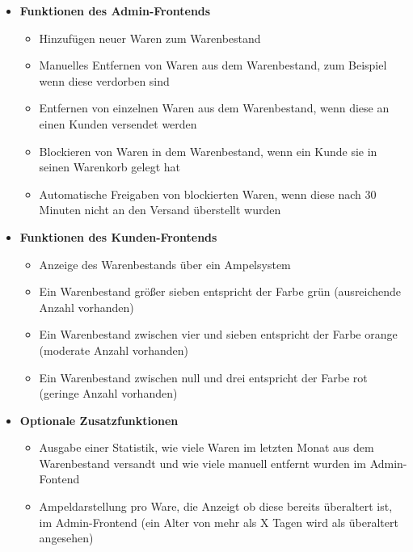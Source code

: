 \begin{itemize}
	\item \textbf{Funktionen des Admin-Frontends}
	\begin{itemize}
		\item Hinzufügen neuer Waren zum Warenbestand
		\item Manuelles Entfernen von Waren aus dem Warenbestand, zum Beispiel wenn diese verdorben sind
		\item Entfernen von einzelnen Waren aus dem Warenbestand, wenn diese an einen Kunden versendet werden
		\item Blockieren von Waren in dem Warenbestand, wenn ein Kunde sie in seinen Warenkorb gelegt hat
		\item Automatische Freigaben von blockierten Waren, wenn diese nach 30 Minuten nicht an den Versand überstellt wurden
	\end{itemize}
	\item \textbf{Funktionen des Kunden-Frontends}
	\begin{itemize}
		\item Anzeige des Warenbestands über ein Ampelsystem 
		\item Ein Warenbestand größer sieben entspricht der Farbe grün (ausreichende Anzahl vorhanden)
		\item Ein Warenbestand zwischen vier und sieben entspricht der Farbe orange (moderate Anzahl vorhanden)		
		\item Ein Warenbestand zwischen null und drei entspricht der Farbe rot (geringe Anzahl vorhanden)
	\end{itemize}
	\item \textbf{Optionale Zusatzfunktionen}
	\begin{itemize}
		\item Ausgabe einer Statistik, wie viele Waren im letzten Monat aus dem Warenbestand versandt und wie viele manuell entfernt wurden im Admin-Fontend
		\item Ampeldarstellung pro Ware, die Anzeigt ob diese bereits überaltert ist, im Admin-Frontend (ein Alter von mehr als X Tagen wird als überaltert angesehen)
	\end{itemize}
\end{itemize}

